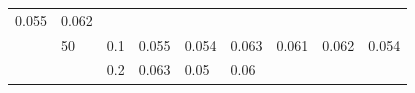 \documentclass[12pt,oneside,a4paper]{reedthesis}
\begin{document}
\begin{longtable}[]{@{}lllllllll@{}}
\begin{minipage}[t]{0.08\columnwidth}
0.055\strut
\end{minipage} & \begin{minipage}[t]{0.08\columnwidth}\raggedright
0.062\strut
\end{minipage}\tabularnewline
\begin{minipage}[t]{0.12\columnwidth}\raggedright
\strut
\end{minipage} & \begin{minipage}[t]{0.09\columnwidth}\raggedright
50\strut
\end{minipage} & \begin{minipage}[t]{0.06\columnwidth}\raggedright
0.1\strut
\end{minipage} & \begin{minipage}[t]{0.08\columnwidth}\raggedright
0.055\strut
\end{minipage} & \begin{minipage}[t]{0.08\columnwidth}\raggedright
0.054\strut
\end{minipage} & \begin{minipage}[t]{0.08\columnwidth}\raggedright
0.063\strut
\end{minipage} & \begin{minipage}[t]{0.08\columnwidth}\raggedright
0.061\strut
\end{minipage} & \begin{minipage}[t]{0.08\columnwidth}\raggedright
0.062\strut
\end{minipage} & \begin{minipage}[t]{0.08\columnwidth}\raggedright
0.054\strut
\end{minipage}\tabularnewline
\begin{minipage}[t]{0.12\columnwidth}\raggedright
\strut
\end{minipage} & \begin{minipage}[t]{0.09\columnwidth}\raggedright
\strut
\end{minipage} & \begin{minipage}[t]{0.06\columnwidth}\raggedright
0.2\strut
\end{minipage} & \begin{minipage}[t]{0.08\columnwidth}\raggedright
0.063\strut
\end{minipage} & \begin{minipage}[t]{0.08\columnwidth}\raggedright
0.05\strut
\end{minipage} & \begin{minipage}[t]{0.08\columnwidth}\raggedright
0.06\strut
\end{minipage} & \begin{minipage}[t]{0.08\columnwidth}\raggedright

\end{minipage}
\end{longtable}
\end{document}
